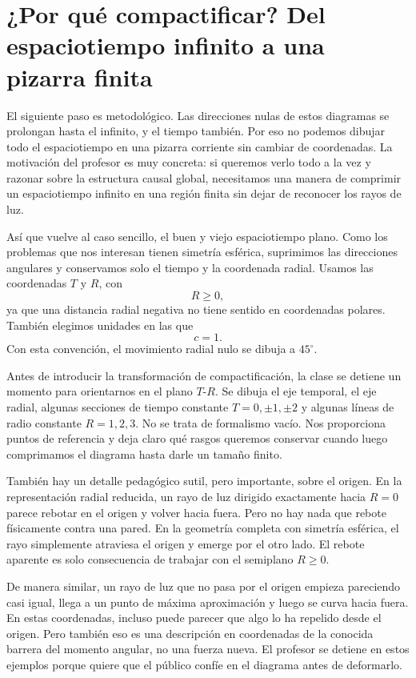 \section{¿Por qué compactificar? Del espaciotiempo infinito a una pizarra finita}

El siguiente paso es metodológico. Las direcciones nulas de estos diagramas se prolongan hasta el infinito, y el tiempo también. Por eso no podemos dibujar todo el espaciotiempo en una pizarra corriente sin cambiar de coordenadas. La motivación del profesor es muy concreta: si queremos verlo todo a la vez y razonar sobre la estructura causal global, necesitamos una manera de comprimir un espaciotiempo infinito en una región finita sin dejar de reconocer los rayos de luz.

Así que vuelve al caso sencillo, el buen y viejo espaciotiempo plano. Como los problemas que nos interesan tienen simetría esférica, suprimimos las direcciones angulares y conservamos solo el tiempo y la coordenada radial. Usamos las coordenadas \(T\) y \(R\), con
\[
R\ge 0,
\]
ya que una distancia radial negativa no tiene sentido en coordenadas polares. También elegimos unidades en las que
\[
c=1.
\]
Con esta convención, el movimiento radial nulo se dibuja a \(45^\circ\).

Antes de introducir la transformación de compactificación, la clase se detiene un momento para orientarnos en el plano \(T\)-\(R\). Se dibuja el eje temporal, el eje radial, algunas secciones de tiempo constante \(T=0,\pm1,\pm2\) y algunas líneas de radio constante \(R=1,2,3\). No se trata de formalismo vacío. Nos proporciona puntos de referencia y deja claro qué rasgos queremos conservar cuando luego comprimamos el diagrama hasta darle un tamaño finito.

También hay un detalle pedagógico sutil, pero importante, sobre el origen. En la representación radial reducida, un rayo de luz dirigido exactamente hacia \(R=0\) parece rebotar en el origen y volver hacia fuera. Pero no hay nada que rebote físicamente contra una pared. En la geometría completa con simetría esférica, el rayo simplemente atraviesa el origen y emerge por el otro lado. El rebote aparente es solo consecuencia de trabajar con el semiplano \(R\ge 0\).

De manera similar, un rayo de luz que no pasa por el origen empieza pareciendo casi igual, llega a un punto de máxima aproximación y luego se curva hacia fuera. En estas coordenadas, incluso puede parecer que algo lo ha repelido desde el origen. Pero también eso es una descripción en coordenadas de la conocida barrera del momento angular, no una fuerza nueva. El profesor se detiene en estos ejemplos porque quiere que el público confíe en el diagrama antes de deformarlo.

